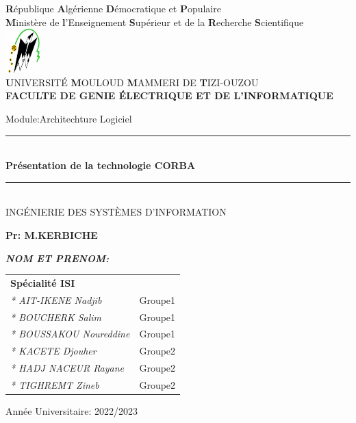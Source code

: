 \thispagestyle{empty}

\begin{center} 

\large \textbf{R}épublique \textbf{A}lgérienne \textbf{D}émocratique et \textbf{P}opulaire\\
\textbf{M}inistère de\textbf{ l}’Enseignement \textbf{S}upérieur et de la\textbf{ R}echerche \textbf{S}cientifique\\
\includegraphics[width=0.1\textwidth]{pdg/ummto.png}\\
\textbf{U}NIVERSITÉ \textbf{M}OULOUD \textbf{M}AMMERI DE \textbf{T}IZI-OUZOU\\
\textbf{ FACULTE DE GENIE ÉLECTRIQUE ET DE L’INFORMATIQUE}\\\vfill


\end{center}


\begin{center}
    \huge Module:Architechture Logiciel\normalsize\\
 
    \rule{0.90\textwidth}{2pt}\\
    \LARGE \textbf
    {Présentation de la technologie \textbf{CORBA}}\\
    \normalsize
    \rule{0.90\textwidth}{2pt}\\
    \large INGÉNIERIE DES SYSTÈMES D'INFORMATION \\
    \vfill
    \begin{flushright}
     \large \textbf {Pr: M.KERBICHE} \\
    \end{flushright}
  \vfill
 
 
\begin{flushleft}   
 \large\emph{\textbf{NOM ET PRENOM:}}\\ \vspace*{0.2cm}
 \begin{tabular}{ll}
  \hline \hline
    \textbf{ Spécialité ISI} \\   
      \emph{* AIT-IKENE Nadjib}    & Groupe1 \\ 
      \emph{* BOUCHERK Salim}   &  Groupe1\\
      \emph{* BOUSSAKOU Noureddine} &Groupe1\\
      \emph{* KACETE Djouher} &     Groupe2 \\
      \emph{* HADJ NACEUR Rayane} &  Groupe2\\
      \emph{* TIGHREMT Zineb} & Groupe2\\
   \hline \hline
\end{tabular}
\end{flushleft}
\vfill 

\begin{flushright}
\large Année Universitaire: 2022/2023\\
\end{flushright}
   
\end{center}
    
%